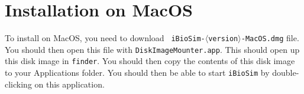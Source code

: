 \documentclass[titlepage,11pt]{article}
\begin{document}
\clearpage

\section{Installation on MacOS}

\noindent
To install on MacOS, you need to download {\tt
  iBioSim-$\langle$version$\rangle$-MacOS.dmg} file.  You should then
open this file with {\tt DiskImageMounter.app}.  This should open up
this disk image in {\tt finder}.  You should then copy the contents of
this disk image to your Applications folder.  You should then be able
to start {\tt iBioSim} by double-clicking on this application. 
\end{document}
